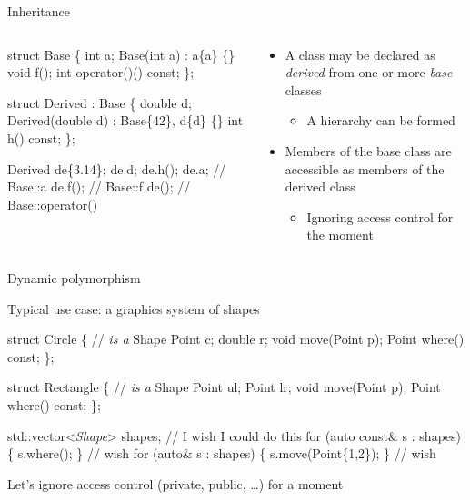 \begin{frame}[fragile]{Inheritance}

  \begin{columns}[T]
    \begin{column}{.4\textwidth}
  \begin{codeblock}
struct Base \{
  int a;
  Base(int a) : a\{a\} \{\}
  void f();
  int operator()() const;
\};

struct Derived \alert{: Base} \{
  double d;
  Derived(double d)
    : Base\{42\}, d\{d\} \{\}
  int h() const;
\};

Derived de\{3.14\};
de.d;
de.h();
de.a;   // Base::a
de.f(); // Base::f
de();   // Base::operator()\end{codeblock}
   
    \end{column}
    \begin{column}{.6\textwidth}

      \begin{itemize}
      \item A class may be declared as \textit{derived} from one or more
        \textit{base} classes
        \begin{itemize}
        \item A hierarchy can be formed
        \end{itemize}
      \item Members of the base class are accessible as members of the derived
        class
        \begin{itemize}
        \item Ignoring access control for the moment
        \end{itemize}
      \end{itemize}
    \end{column}
  \end{columns}

\end{frame}

\begin{frame}[fragile]{Dynamic polymorphism}

  Typical use case: a graphics system of shapes

  \begin{codeblock}

struct Circle \{ // \textit{is a} Shape
  Point c;
  double r;
  void move(Point p);
  Point where() const;
\};

struct Rectangle \{ // \textit{is a} Shape
  Point ul;
  Point lr;
  void move(Point p);
  Point where() const;
\};

std::vector<\textit{Shape}> shapes;                     // I wish I could do this
for (auto const& s : shapes) \{ s.where(); \}    // wish
for (auto& s : shapes) \{ s.move(Point\{1,2\}); \} // wish\end{codeblock}

{\footnotesize Let's ignore access control (private, public, \ldots) for a moment}

\end{frame}


